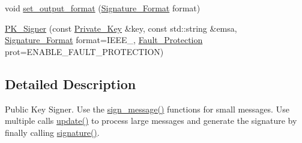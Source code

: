 \begin{DoxyCompactItemize}
\item 
void \hyperlink{classBotan_1_1PK__Signer_abb7b28ec89afba6a1a2254963169088a}{set\-\_\-output\-\_\-format} (\hyperlink{namespaceBotan_ad8a9578625edf847cbcba3ae15648cda}{Signature\-\_\-\-Format} format)
\item 
\hyperlink{classBotan_1_1PK__Signer_ab206495d59a8d1e7f41a76103eaf6fbb}{P\-K\-\_\-\-Signer} (const \hyperlink{classBotan_1_1Private__Key}{Private\-\_\-\-Key} \&key, const std\-::string \&emsa, \hyperlink{namespaceBotan_ad8a9578625edf847cbcba3ae15648cda}{Signature\-\_\-\-Format} format=I\-E\-E\-E\-\_, \hyperlink{namespaceBotan_aae2b282dc87e72b73f8c55ba01d88b24}{Fault\-\_\-\-Protection} prot=E\-N\-A\-B\-L\-E\-\_\-\-F\-A\-U\-L\-T\-\_\-\-P\-R\-O\-T\-E\-C\-T\-I\-O\-N)
\end{DoxyCompactItemize}


\subsection{Detailed Description}
Public Key Signer. Use the \hyperlink{classBotan_1_1PK__Signer_a4a9b1162315ab5805144fe620f653ced}{sign\-\_\-message()} functions for small messages. Use multiple calls \hyperlink{classBotan_1_1PK__Signer_a060872024733a2623ec5d0bccc3d900a}{update()} to process large messages and generate the signature by finally calling \hyperlink{classBotan_1_1PK__Signer_ad73609f27265f1e5fce767015c3bea68}{signature()}. 

